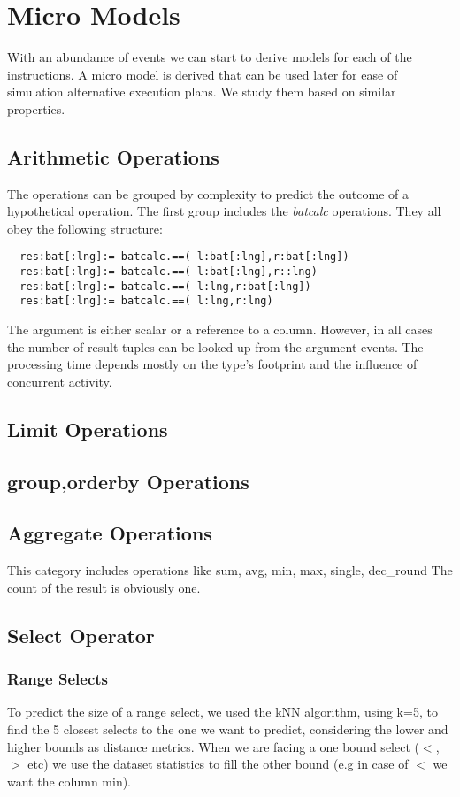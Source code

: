 \section{Micro Models}
With an abundance of events we can start to derive models for each of the instructions.
A micro model is derived that can be used later for ease of simulation
alternative execution plans. We study them based on similar properties.

\subsection{Arithmetic Operations}
The operations can be grouped by complexity to predict the outcome of a hypothetical operation.
The first group includes the {\em batcalc} operations.
They all obey the following structure:
\begin{verbatim}
  res:bat[:lng]:= batcalc.==( l:bat[:lng],r:bat[:lng])
  res:bat[:lng]:= batcalc.==( l:bat[:lng],r::lng)
  res:bat[:lng]:= batcalc.==( l:lng,r:bat[:lng])
  res:bat[:lng]:= batcalc.==( l:lng,r:lng)

\end{verbatim}
The argument is either scalar or a reference to a column.
However, in all cases the number of result tuples can be looked up from the argument events.
The processing time depends mostly on the type's footprint and the influence of concurrent activity.


\subsection{Limit Operations}
\subsection{group,orderby Operations}
\subsection{Aggregate Operations}
This category includes operations like sum, avg, min, max, single, dec\_round
The count of the result is obviously one.

\subsection{Select Operator}
\subsubsection{Range Selects}
To predict the size of a range select, we used the kNN algorithm,
using k=5, to find the 5 closest selects to the one we want to predict,
considering the lower and higher bounds as distance metrics.
When we are facing a one bound select ($<$,$>$ etc) we use the
dataset statistics to fill the other bound (e.g in case of $<$ we want the column min).
